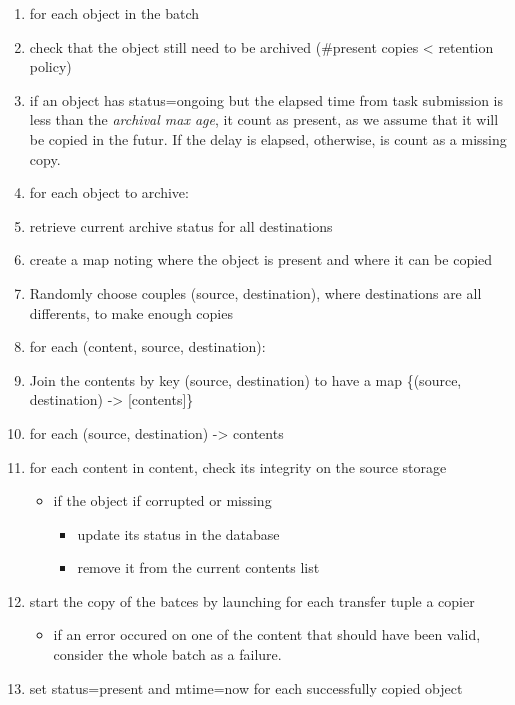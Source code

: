 \begin{enumerate}
\def\labelenumi{\arabic{enumi}.}
\itemsep1pt\parskip0pt
\item
  for each object in the batch
\item
  check that the object still need to be archived (\#present copies
  \textless{} retention policy)
\item
  if an object has status=ongoing but the elapsed time from task
  submission is less than the \emph{archival max age}, it count as
  present, as we assume that it will be copied in the futur. If the
  delay is elapsed, otherwise, is count as a missing copy.
\item
  for each object to archive:
\item
  retrieve current archive status for all destinations
\item
  create a map noting where the object is present and where it can be
  copied
\item
  Randomly choose couples (source, destination), where destinations are
  all differents, to make enough copies
\item
  for each (content, source, destination):
\item
  Join the contents by key (source, destination) to have a map
  \{(source, destination) -\textgreater{} {[}contents{]}\}
\item
  for each (source, destination) -\textgreater{} contents
\item
  for each content in content, check its integrity on the source storage

  \begin{itemize}
  \itemsep1pt\parskip0pt
  \item
    if the object if corrupted or missing

    \begin{itemize}
    \itemsep1pt\parskip0pt
    \item
      update its status in the database
    \item
      remove it from the current contents list
    \end{itemize}
  \end{itemize}
\item
  start the copy of the batces by launching for each transfer tuple a
  copier

  \begin{itemize}
  \itemsep1pt\parskip0pt
  \item
    if an error occured on one of the content that should have been
    valid, consider the whole batch as a failure.
  \end{itemize}
\item
  set status=present and mtime=now for each successfully copied object
\end{enumerate}

